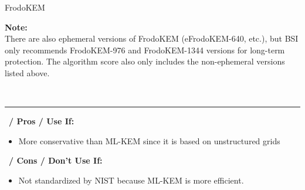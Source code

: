\begin{algorithmbox}{FrodoKEM}
\begin{minipage}[t]{0.6\textwidth}
        {\bfseries Note:}\\
        \normalfont There are also ephemeral versions of FrodoKEM (eFrodoKEM-640, etc.), but BSI only recommends FrodoKEM-976 and FrodoKEM-1344 versions for long-term protection. The algorithm score also only includes the non-ephemeral versions listed above.
    \end{minipage}\\[\baselineskip]
    \hrule
    \vspace{1\baselineskip}
    \begin{minipage}[t]{0.49\textwidth}
        \scriptsize\faThumbsUp\, {\bfseries / Pros / Use If:}
        \begin{itemize}[leftmargin=*]
            \setlength\itemsep{0em}
            \item More conservative than ML-KEM since it is based on unstructured grids
        \end{itemize}
    \end{minipage}
    \hfill
    \begin{minipage}[t]{0.49\textwidth}
        \scriptsize \faThumbsDown\, {\bfseries / Cons / Don't Use If:}
        \begin{itemize}[leftmargin=*]
            \setlength\itemsep{0em}
            \item Not standardized by NIST because ML-KEM is more efficient.
        \end{itemize}
    \end{minipage}
\end{algorithmbox}
